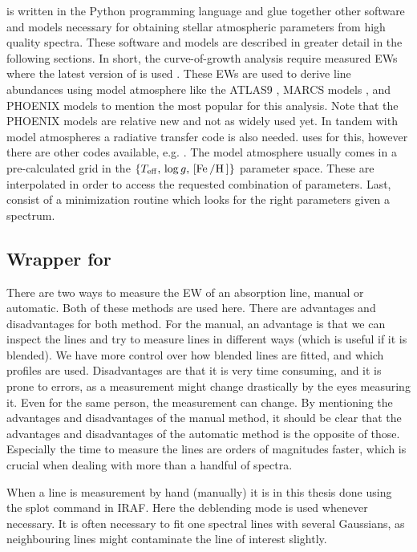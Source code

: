 \FASMA is written in the Python programming language and glue together other
software and models necessary for obtaining stellar atmospheric parameters from
high quality spectra. These software and models are described in greater detail
in the following sections. In short, the curve-of-growth analysis require
measured EWs where the latest version of \ARES is used \citep{Sousa2015a}. These
EWs are used to derive line abundances using model atmosphere like the ATLAS9
\citep{Kurucz1993}, MARCS models \citep{Gustafson2008}, and PHOENIX models
\citep{Husser2013} to mention the most popular for this analysis. Note that the
PHOENIX models are relative new and not as widely used yet. In tandem with model
atmospheres a radiative transfer code is also needed. \FASMA uses \MOOG
\citep{Sneden1973} for this, however there are other codes available, e.g.
. The model atmosphere usually comes
in a pre-calculated grid in the $\{T_\mathrm{eff},\,\log
g,\,[\ion{Fe}/\ion{H}]\}$ parameter space. These are interpolated in order to
access the requested combination of parameters. Last, \FASMA consist of a
minimization routine which looks for the right parameters given a spectrum.



\subsection{Wrapper for \ARES}
\label{sec:measureEW}

There are two ways to measure the EW of an absorption line, manual or automatic.
Both of these methods are used here. There are advantages and disadvantages for
both method. For the manual, an advantage is that we can inspect the lines and
try to measure lines in different ways (which is useful if it is blended). We
have more control over how blended lines are fitted, and which profiles are
used. Disadvantages are that it is very time consuming, and it is prone to
errors, as a measurement might change drastically by the eyes measuring it. Even
for the same person, the measurement can change. By mentioning the advantages
and disadvantages of the manual method, it should be clear that the advantages
and disadvantages of the automatic method is the opposite of those. Especially
the time to measure the lines are orders of magnitudes faster, which is crucial
when dealing with more than a handful of spectra.

When a line is measurement by hand (manually) it is in this thesis done using
the splot command in IRAF. Here the deblending mode is used whenever necessary.
It is often necessary to fit one spectral lines with several Gaussians, as
neighbouring lines might contaminate the line of interest slightly.

